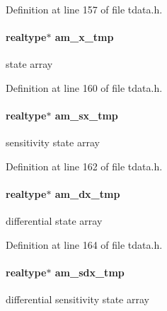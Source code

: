 Definition at line 157 of file tdata.\+h.

\hypertarget{struct_temp_data_a7751aebb2b290fc4a51d9ca5f47fb455}{}
\paragraph[{am\+\_\+x\+\_\+tmp}]{\setlength{\rightskip}{0pt plus 5cm}realtype$\ast$ am\+\_\+x\+\_\+tmp}\label{struct_temp_data_a7751aebb2b290fc4a51d9ca5f47fb455}
state array 

Definition at line 160 of file tdata.\+h.

\hypertarget{struct_temp_data_a4b0bde10a390f324386b07acacd367bc}{}
\paragraph[{am\+\_\+sx\+\_\+tmp}]{\setlength{\rightskip}{0pt plus 5cm}realtype$\ast$ am\+\_\+sx\+\_\+tmp}\label{struct_temp_data_a4b0bde10a390f324386b07acacd367bc}
sensitivity state array 

Definition at line 162 of file tdata.\+h.

\hypertarget{struct_temp_data_abd683baa60bb69c9731961ba50e1455d}{}
\paragraph[{am\+\_\+dx\+\_\+tmp}]{\setlength{\rightskip}{0pt plus 5cm}realtype$\ast$ am\+\_\+dx\+\_\+tmp}\label{struct_temp_data_abd683baa60bb69c9731961ba50e1455d}
differential state array 

Definition at line 164 of file tdata.\+h.

\hypertarget{struct_temp_data_ac0bc306224fbe129accbc959efda5451}{}
\paragraph[{am\+\_\+sdx\+\_\+tmp}]{\setlength{\rightskip}{0pt plus 5cm}realtype$\ast$ am\+\_\+sdx\+\_\+tmp}\label{struct_temp_data_ac0bc306224fbe129accbc959efda5451}
differential sensitivity state array 

